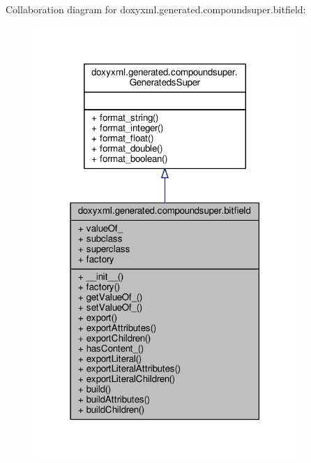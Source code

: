 Collaboration diagram for doxyxml.\+generated.\+compoundsuper.\+bitfield\+:
\nopagebreak
\begin{figure}[H]
\begin{center}
\leavevmode
\includegraphics[width=283pt]{d7/d08/classdoxyxml_1_1generated_1_1compoundsuper_1_1bitfield__coll__graph}
\end{center}
\end{figure}
